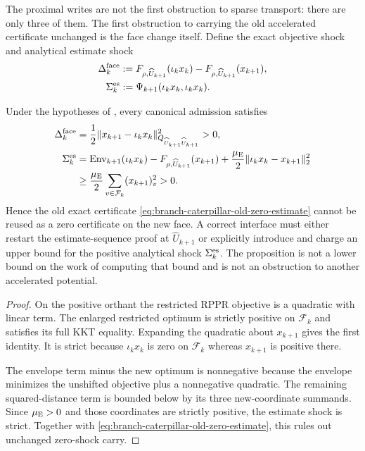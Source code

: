 The proximal writes are not the first obstruction to sparse transport: there
are only three of them.  The first obstruction to carrying the old
accelerated certificate unchanged is the face change itself.  Define the
exact objective shock and analytical estimate shock
\begin{align}
 \Delta_k^{\rm face}
 &:=F_{\rho,\widehat U_{k+1}}(\iota_kx_k)
    -F_{\rho,\widehat U_{k+1}}(x_{k+1}),
 \label{eq:branch-caterpillar-objective-face-shock}\\
 \Sigma_k^{\rm es}
 &:=\Psi_{k+1}(\iota_kx_k,\iota_kx_k).
 \label{eq:branch-caterpillar-estimate-face-shock}
\end{align}

\begin{proposition}
\label{prop:branch-caterpillar-zero-estimate-carry-fails}
Under the hypotheses of
, every canonical
admission satisfies
\begin{align}
 \Delta_k^{\rm face}
 &=\frac12\lVert x_{k+1}-\iota_kx_k\rVert_{
                 Q_{\widehat U_{k+1}\widehat U_{k+1}}}^2>0,
 \label{eq:branch-caterpillar-objective-face-shock-identity}\\
 \Sigma_k^{\rm es}
 &=\operatorname{Env}_{k+1}(\iota_kx_k)
   -F_{\rho,\widehat U_{k+1}}(x_{k+1})
   +\frac{\mu_{\rm E}}2
      \lVert\iota_kx_k-x_{k+1}\rVert_2^2
 \notag\\
 &\geq\frac{\mu_{\rm E}}2
      \sum_{v\in\mathcal F_k}(x_{k+1})_v^2>0.
 \label{eq:branch-caterpillar-estimate-face-shock-positive}
\end{align}
Hence the old exact certificate
\cref{eq:branch-caterpillar-old-zero-estimate} cannot be reused as a zero
certificate on the new face.  A correct interface must either restart the
estimate-sequence proof at $\widehat U_{k+1}$ or explicitly introduce and
charge an upper bound for the positive analytical shock
$\Sigma_k^{\rm es}$.  The proposition is not a lower bound on the work of
computing that bound and is not an obstruction to another accelerated
potential.
\end{proposition}

\begin{proof}
On the positive orthant the restricted RPPR objective is a quadratic with
linear term.  The enlarged restricted optimum is strictly positive on
$\mathcal F_k$ and satisfies its full KKT equality.  Expanding the quadratic
about $x_{k+1}$ gives the first identity.  It is strict because
$\iota_kx_k$ is zero on $\mathcal F_k$ whereas $x_{k+1}$ is positive there.

The envelope term minus the new optimum is nonnegative because the envelope
minimizes the unshifted objective plus a nonnegative quadratic.  The remaining
squared-distance term is bounded below by its three new-coordinate summands.
Since $\mu_{\rm E}>0$ and those coordinates are strictly positive, the
estimate shock is strict.  Together with
\cref{eq:branch-caterpillar-old-zero-estimate}, this rules out unchanged
zero-shock carry.
\end{proof}

